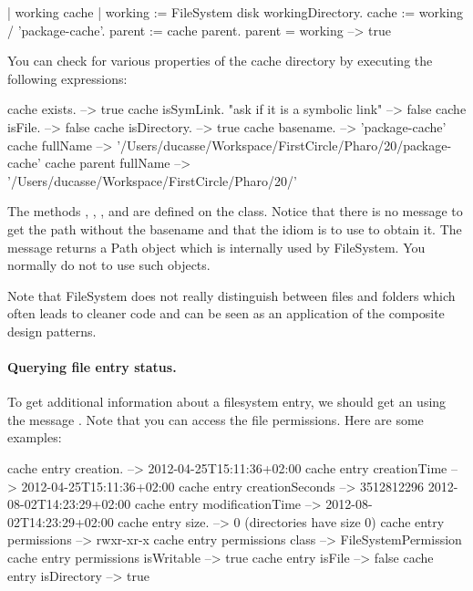 \documentclass[a4paper,10pt,twoside]{book}
\begin{document}
\begin{code}{}
| working cache |
working := FileSystem disk workingDirectory.
cache := working / 'package-cache'.
parent := cache parent.
parent = working			
--> true
\end{code}

You can check for various properties of the cache directory by executing the following expressions:

\begin{code}{}
cache exists.														--> true
cache isSymLink. "ask if it is a symbolic link"		--> false
cache isFile.														--> false
cache isDirectory.												--> true
cache basename.						    					 --> 'package-cache'
cache fullName           
  --> '/Users/ducasse/Workspace/FirstCircle/Pharo/20/package-cache'
cache parent fullName    
  --> '/Users/ducasse/Workspace/FirstCircle/Pharo/20/'
\end{code}
 


The methods , , , and   are defined on the  class. Notice that there is no message to get 
the path without the basename and that the idiom is to use  to obtain it.
The message  returns a Path object which is internally used by FileSystem. You normally do not to use such objects. 
  
Note that FileSystem does not really distinguish between files and folders which often leads to cleaner code and can be seen as an application of the composite design patterns.   
  
\paragraph{Querying file entry status.}
To get additional information about a filesystem entry, we should get an  using the message . Note that you can access the file permissions. Here are some examples:

\begin{code}{}
cache entry creation.		-->  2012-04-25T15:11:36+02:00
cache entry creationTime -->  2012-04-25T15:11:36+02:00
cache entry creationSeconds -->  3512812296 2012-08-02T14:23:29+02:00
cache entry modificationTime -->  2012-08-02T14:23:29+02:00
cache entry size.			--> 0 (directories have size 0)
cache entry permissions		-->  rwxr-xr-x
cache entry permissions class		-->  FileSystemPermission
cache entry permissions isWritable --> true
cache entry isFile			--> false
cache entry isDirectory 		--> true
\end{code} 
\end{document}
